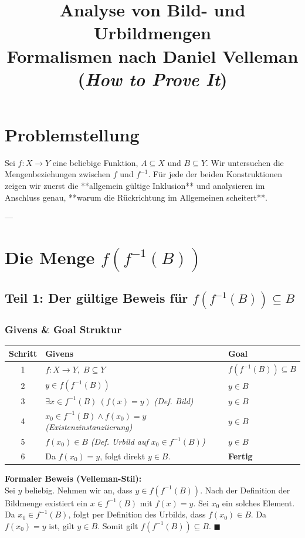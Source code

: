 \documentclass[11pt,a4paper]{article}
\title{\textbf{Analyse von Bild- und Urbildmengen}\\[0.3em]
\large Formalismen nach Daniel Velleman (\textit{How to Prove It})}
\author{}
\date{}
\begin{document}
\maketitle

\section*{Problemstellung}
Sei $f: X \to Y$ eine beliebige Funktion, $A \subseteq X$ und $B \subseteq Y$. Wir untersuchen die Mengenbeziehungen zwischen $f$ und $f^{-1}$. Für jede der beiden Konstruktionen zeigen wir zuerst die **allgemein gültige Inklusion** und analysieren im Anschluss genau, **warum die Rückrichtung im Allgemeinen scheitert**.

---

\section{Die Menge $f(f^{-1}(B))$}

\subsection*{Teil 1: Der gültige Beweis für $f(f^{-1}(B)) \subseteq B$}

\subsubsection*{Givens \& Goal Struktur}
\begin{vellemantable}
\centering
\begin{tabular}{cll}
\textbf{Schritt} & \textbf{Givens} & \textbf{Goal} \\ \hline
1 & $f: X \to Y, \; B \subseteq Y$ & $f(f^{-1}(B)) \subseteq B$ \\
2 & $y \in f(f^{-1}(B))$ & $y \in B$ \\
3 & $\exists x \in f^{-1}(B) \: (f(x) = y)$ \quad \textit{(Def. Bild)} & $y \in B$ \\
4 & $x_0 \in f^{-1}(B) \land f(x_0) = y$ \quad \textit{(Existenzinstanziierung)} & $y \in B$ \\
5 & $f(x_0) \in B$ \quad \textit{(Def. Urbild auf $x_0 \in f^{-1}(B)$)} & $y \in B$ \\
6 & Da $f(x_0) = y$, folgt direkt $y \in B$. & \textbf{Fertig} \\
\end{tabular}
\end{vellemantable}

\begin{proofbox}
\textbf{Formaler Beweis (Velleman-Stil):}\\
Sei $y$ beliebig. Nehmen wir an, dass $y \in f(f^{-1}(B))$. Nach der Definition der Bildmenge existiert ein $x \in f^{-1}(B)$ mit $f(x) = y$. Sei $x_0$ ein solches Element. Da $x_0 \in f^{-1}(B)$, folgt per Definition des Urbilds, dass $f(x_0) \in B$. Da $f(x_0) = y$ ist, gilt $y \in B$. Somit gilt $f(f^{-1}(B)) \subseteq B$. \hfill $\blacksquare$
\end{proofbox}
\end{document}
